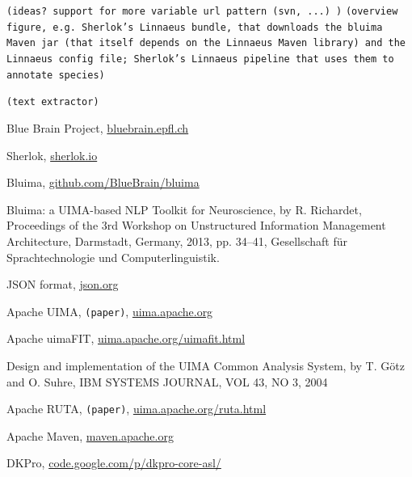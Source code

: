 \documentclass{article}
\newcommand{\TODO}[1]{\texttt{\textcolor{YellowOrange}{(#1)}}} %
\begin{document}
\TODO{ideas? support for more variable url pattern (svn, ...) }
\TODO{overview figure, e.g.  Sherlok's Linnaeus bundle, that downloads the bluima Maven jar (that itself depends on the Linnaeus Maven library) and the Linnaeus config file; Sherlok's Linnaeus pipeline that uses them to annotate species}

\TODO{text extractor}


\begin{thebibliography}{99}

    Blue Brain Project,
    \href{http://bluebrain.epfl.ch/}{bluebrain.epfl.ch}

    Sherlok,
    \href{http://sherlok.io}{sherlok.io}

    Bluima,
    \href{https://github.com/BlueBrain/bluima}{github.com/BlueBrain/bluima}

    Bluima: a UIMA-based NLP Toolkit for Neuroscience,
    by R. Richardet,
    Proceedings of the 3rd Workshop on Unstructured Information Management Architecture, Darmstadt,
    Germany, 2013, pp. 34–41, Gesellschaft für Sprachtechnologie und Computerlinguistik.

    JSON format,
    \href{http://json.org/}{json.org}

    Apache UIMA,
	\TODO{paper},
    \href{https://uima.apache.org/}{uima.apache.org}

    Apache uimaFIT,
    \href{https://uima.apache.org/uimafit.html}{uima.apache.org/uimafit.html}

    Design and implementation of the UIMA Common Analysis System,
    by T. Götz and O. Suhre,
    IBM SYSTEMS JOURNAL, VOL 43, NO 3, 2004

    Apache RUTA,
	\TODO{paper},
    \href{https://uima.apache.org/ruta.html}{uima.apache.org/ruta.html}

    Apache Maven,
    \href{https://maven.apache.org/}{maven.apache.org}

    DKPro,
    \href{https://code.google.com/p/dkpro-core-asl/}{code.google.com/p/dkpro-core-asl/}


\end{thebibliography}
\end{document}
